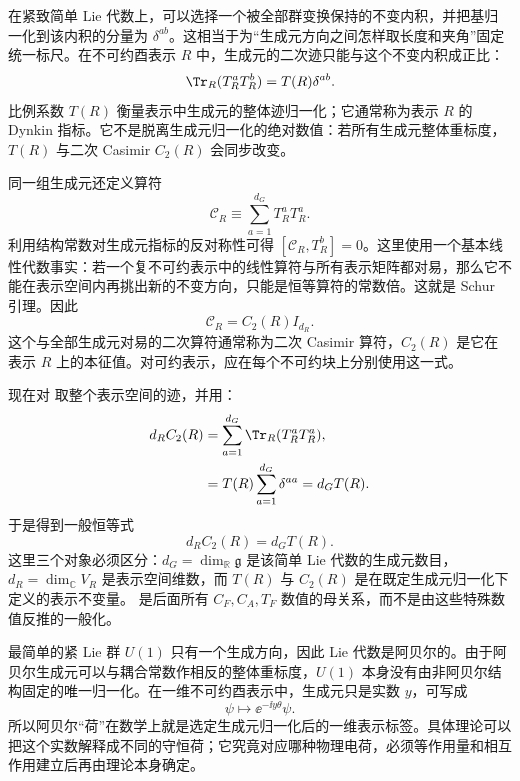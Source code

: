 在紧致简单 Lie 代数上，可以选择一个被全部群变换保持的不变内积，并把基归一化到该内积的分量为 $\delta^{ab}$。这相当于为“生成元方向之间怎样取长度和夹角”固定统一标尺。在不可约酉表示 $R$ 中，生成元的二次迹只能与这个不变内积成正比：
\begin{equation}
 {
 \Tr_R(T_R^aT_R^b)=T(R)\delta^{ab}.}
 \label{eq:dynkin-index-dp11}
\end{equation}
比例系数 $T(R)$ 衡量表示中生成元的整体迹归一化；它通常称为表示 $R$ 的 Dynkin 指标。它不是脱离生成元归一化的绝对数值：若所有生成元整体重标度，$T(R)$ 与二次 Casimir $C_2(R)$ 会同步改变。

同一组生成元还定义算符
\begin{equation}
 \mathcal C_R\equiv\sum_{a=1}^{d_G}T_R^aT_R^a.
 \label{eq:quadratic-invariant-operator-dp68}
\end{equation}
利用结构常数对生成元指标的反对称性可得 $[\mathcal C_R,T_R^b]=0$。这里使用一个基本线性代数事实：若一个复不可约表示中的线性算符与所有表示矩阵都对易，那么它不能在表示空间内再挑出新的不变方向，只能是恒等算符的常数倍。这就是 Schur 引理。因此
\begin{equation}
 {
 \mathcal C_R=C_2(R)I_{d_R}.}
 \label{eq:casimir-general-rep-dp11}
\end{equation}
这个与全部生成元对易的二次算符通常称为二次 Casimir 算符，$C_2(R)$ 是它在表示 $R$ 上的本征值。对可约表示，应在每个不可约块上分别使用这一式。

现在对 取整个表示空间的迹，并用：
\begin{align}
 d_RC_2(R)
 &=\sum_{a=1}^{d_G}\Tr_R(T_R^aT_R^a),\\
 &=T(R)\sum_{a=1}^{d_G}\delta^{aa}
 =d_GT(R).
\end{align}
于是得到一般恒等式
\begin{equation}
 {d_RC_2(R)=d_GT(R).}
 \label{eq:casimir-dynkin-relation-dp11}
\end{equation}
这里三个对象必须区分：$d_G=\dim_{\mathbb R}\mathfrak g$ 是该简单 Lie 代数的生成元数目，$d_R=\dim_{\mathbb C}V_R$ 是表示空间维数，而 $T(R)$ 与 $C_2(R)$ 是在既定生成元归一化下定义的表示不变量。 是后面所有 $C_F,C_A,T_F$ 数值的母关系，而不是由这些特殊数值反推的一般化。

最简单的紧 Lie 群 $U(1)$ 只有一个生成方向，因此 Lie 代数是阿贝尔的。由于阿贝尔生成元可以与耦合常数作相反的整体重标度，$U(1)$ 本身没有由非阿贝尔结构固定的唯一归一化。在一维不可约酉表示中，生成元只是实数 $y$，可写成
\begin{equation}
 \psi\longmapsto \ee^{-\ii y\theta}\psi.
 \label{eq:u1-charge-rep-dp11}
\end{equation}
所以阿贝尔“荷”在数学上就是选定生成元归一化后的一维表示标签。具体理论可以把这个实数解释成不同的守恒荷；它究竟对应哪种物理电荷，必须等作用量和相互作用建立后再由理论本身确定。

